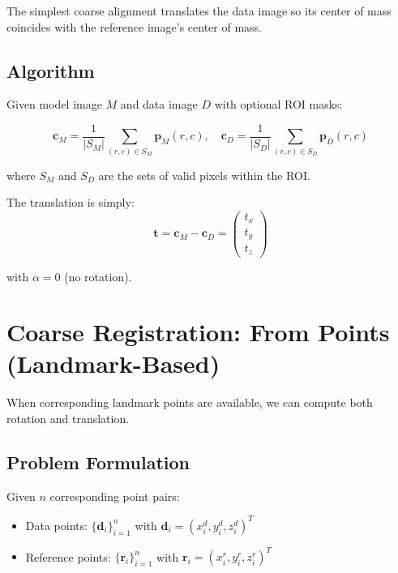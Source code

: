 \documentclass[11pt,a4paper]{article}
\begin{document}
The simplest coarse alignment translates the data image so its center of mass coincides with the reference image's center of mass.

\subsection{Algorithm}

Given model image $M$ and data image $D$ with optional ROI masks:

\begin{equation}
\mathbf{c}_M = \frac{1}{|S_M|} \sum_{(r,c) \in S_M} \mathbf{p}_M(r,c), \quad
\mathbf{c}_D = \frac{1}{|S_D|} \sum_{(r,c) \in S_D} \mathbf{p}_D(r,c)
\end{equation}

where $S_M$ and $S_D$ are the sets of valid pixels within the ROI.

The translation is simply:
\begin{equation}
\mathbf{t} = \mathbf{c}_M - \mathbf{c}_D = \begin{pmatrix} t_x \\ t_y \\ t_z \end{pmatrix}
\end{equation}

with $\alpha = 0$ (no rotation).

\section{Coarse Registration: From Points (Landmark-Based)}

When corresponding landmark points are available, we can compute both rotation and translation.

\subsection{Problem Formulation}

Given $n$ corresponding point pairs:
\begin{itemize}
    \item Data points: $\{\mathbf{d}_i\}_{i=1}^n$ with $\mathbf{d}_i = (x_i^d, y_i^d, z_i^d)^T$
    \item Reference points: $\{\mathbf{r}_i\}_{i=1}^n$ with $\mathbf{r}_i = (x_i^r, y_i^r, z_i^r)^T$
\end{itemize}
\end{document}
